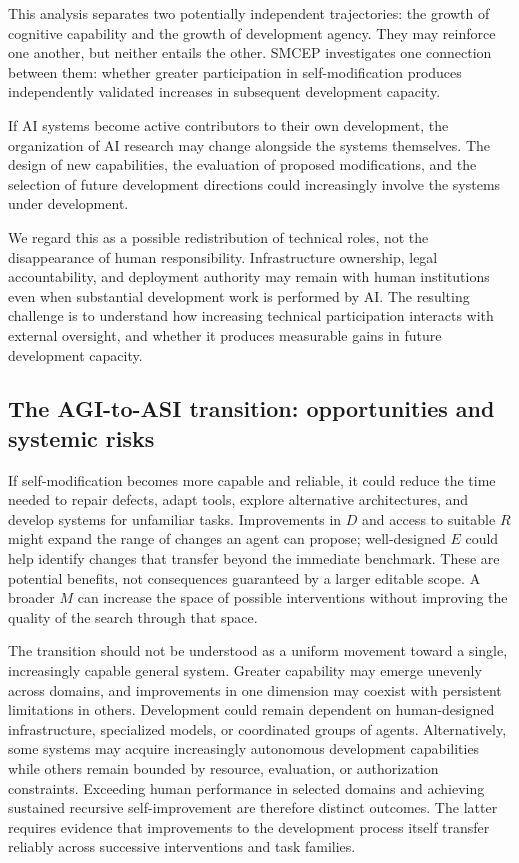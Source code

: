 \documentclass[11pt,a4paper]{article}
\begin{document}
This analysis separates two potentially independent trajectories: the growth of cognitive capability and the growth of development agency. They may reinforce one another, but neither entails the other. SMCEP investigates one connection between them: whether greater participation in self-modification produces independently validated increases in subsequent development capacity.

If AI systems become active contributors to their own development, the organization of AI research
may change alongside the systems themselves. The design of new capabilities, the evaluation of proposed modifications, and the selection of future development directions could increasingly involve the systems under development.

We regard this as a possible redistribution of technical roles, not the disappearance of human
responsibility. Infrastructure ownership, legal accountability, and deployment authority may
remain with human institutions even when substantial development work is performed by AI.
The resulting challenge is to understand how increasing technical participation interacts with
external oversight, and whether it produces measurable gains in future development capacity.

\subsection{The AGI-to-ASI transition: opportunities and systemic risks}
If self-modification becomes more capable and reliable, it could reduce the time needed to repair defects, adapt tools, explore alternative architectures, and develop systems for unfamiliar tasks. Improvements in $D$ and access to suitable $R$ might expand the range of changes an agent can propose; well-designed $E$ could help identify changes that transfer beyond the immediate benchmark. These are potential benefits, not consequences guaranteed by a larger editable scope. A broader $M$ can increase the space of possible interventions without improving the quality of the search through that space.

The transition should not be understood as a uniform movement toward a single, increasingly capable general system. Greater capability may emerge unevenly across domains, and improvements in one dimension may coexist with persistent limitations in others. Development could remain dependent on human-designed infrastructure, specialized models, or coordinated groups of agents. Alternatively, some systems may acquire increasingly autonomous development capabilities while others remain bounded by resource, evaluation, or authorization constraints. Exceeding human performance in selected domains and achieving sustained recursive self-improvement are therefore distinct outcomes. The latter requires evidence that improvements to the development process itself transfer reliably across successive interventions and task families.
\end{document}
